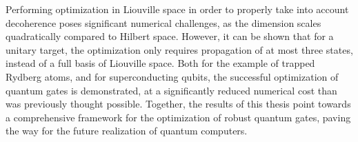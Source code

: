 Performing optimization in Liouville space in order to properly take into
account decoherence poses significant numerical challenges, as the dimension
scales quadratically compared to Hilbert space. However, it can be shown that
for a unitary target, the optimization only requires propagation of at most
three states, instead of a full basis of Liouville space. Both for the example
of trapped Rydberg atoms, and for superconducting qubits, the
successful optimization of quantum gates is demonstrated, at a significantly
reduced numerical cost than was previously thought possible. Together, the
results of this thesis point towards a comprehensive framework for the
optimization of robust quantum gates, paving the way for the future
realization of quantum computers.
